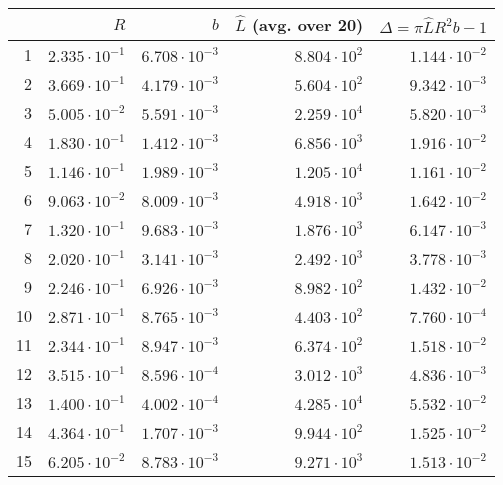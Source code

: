 \begin{tabular}{rrrrr}
\hline
    &       $R$ &       $b$ &   $\hat L$ (avg. over 20) &   $\Delta = \pi\hat LR^{2}b-1$ \\
\hline
  1 & $2.335\cdot10^{-1}$ & $6.708\cdot10^{-3}$ &                 $8.804\cdot10^{2}$ &                      $1.144\cdot10^{-2}$ \\
  2 & $3.669\cdot10^{-1}$ & $4.179\cdot10^{-3}$ &                 $5.604\cdot10^{2}$ &                      $9.342\cdot10^{-3}$ \\
  3 & $5.005\cdot10^{-2}$ & $5.591\cdot10^{-3}$ &                 $2.259\cdot10^{4}$ &                      $5.820\cdot10^{-3}$ \\
  4 & $1.830\cdot10^{-1}$ & $1.412\cdot10^{-3}$ &                 $6.856\cdot10^{3}$ &                      $1.916\cdot10^{-2}$ \\
  5 & $1.146\cdot10^{-1}$ & $1.989\cdot10^{-3}$ &                 $1.205\cdot10^{4}$ &                      $1.161\cdot10^{-2}$ \\
  6 & $9.063\cdot10^{-2}$ & $8.009\cdot10^{-3}$ &                 $4.918\cdot10^{3}$ &                      $1.642\cdot10^{-2}$ \\
  7 & $1.320\cdot10^{-1}$ & $9.683\cdot10^{-3}$ &                 $1.876\cdot10^{3}$ &                      $6.147\cdot10^{-3}$ \\
  8 & $2.020\cdot10^{-1}$ & $3.141\cdot10^{-3}$ &                 $2.492\cdot10^{3}$ &                      $3.778\cdot10^{-3}$ \\
  9 & $2.246\cdot10^{-1}$ & $6.926\cdot10^{-3}$ &                 $8.982\cdot10^{2}$ &                      $1.432\cdot10^{-2}$ \\
 10 & $2.871\cdot10^{-1}$ & $8.765\cdot10^{-3}$ &                 $4.403\cdot10^{2}$ &                      $7.760\cdot10^{-4}$ \\
 11 & $2.344\cdot10^{-1}$ & $8.947\cdot10^{-3}$ &                 $6.374\cdot10^{2}$ &                      $1.518\cdot10^{-2}$ \\
 12 & $3.515\cdot10^{-1}$ & $8.596\cdot10^{-4}$ &                 $3.012\cdot10^{3}$ &                      $4.836\cdot10^{-3}$ \\
 13 & $1.400\cdot10^{-1}$ & $4.002\cdot10^{-4}$ &                 $4.285\cdot10^{4}$ &                      $5.532\cdot10^{-2}$ \\
 14 & $4.364\cdot10^{-1}$ & $1.707\cdot10^{-3}$ &                 $9.944\cdot10^{2}$ &                      $1.525\cdot10^{-2}$ \\
 15 & $6.205\cdot10^{-2}$ & $8.783\cdot10^{-3}$ &                 $9.271\cdot10^{3}$ &                      $1.513\cdot10^{-2}$ \\
\hline
\end{tabular}